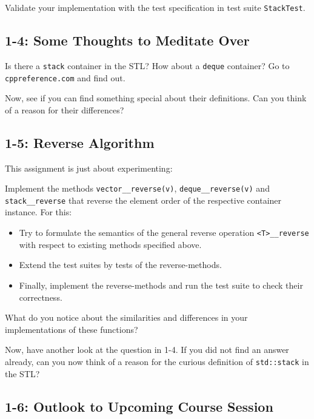 \documentclass[]{article}
\providecommand{\tightlist}{%
  \setlength{\itemsep}{0pt}\setlength{\parskip}{0pt}}
\begin{document}
Validate your implementation with the test specification in test suite
\texttt{StackTest}.

\subsection{1-4: Some Thoughts to Meditate
Over}\label{some-thoughts-to-meditate-over}

Is there a \texttt{stack} container in the STL? How about a
\texttt{deque} container? Go to \texttt{cppreference.com} and find out.

Now, see if you can find something special about their definitions. Can
you think of a reason for their differences?

\subsection{1-5: Reverse Algorithm}\label{reverse-algorithm}

This assignment is just about experimenting:

Implement the methods \texttt{vector\_\_reverse(v)},
\texttt{deque\_\_reverse(v)} and \texttt{stack\_\_reverse} that reverse
the element order of the respective container instance. For this:

\begin{itemize}
\tightlist
\item
  Try to formulate the semantics of the general reverse operation
  \texttt{\textless{}T\textgreater{}\_\_reverse} with respect to
  existing methods specified above.
\item
  Extend the test suites by tests of the reverse-methods.
\item
  Finally, implement the reverse-methods and run the test suite to check
  their correctness.
\end{itemize}

What do you notice about the similarities and differences in your
implementations of these functions?

Now, have another look at the question in 1-4. If you did not find an
answer already, can you now think of a reason for the curious definition
of \texttt{std::stack} in the STL?

\subsection{1-6: Outlook to Upcoming Course
Session}\label{outlook-to-upcoming-course-session}
\end{document}
